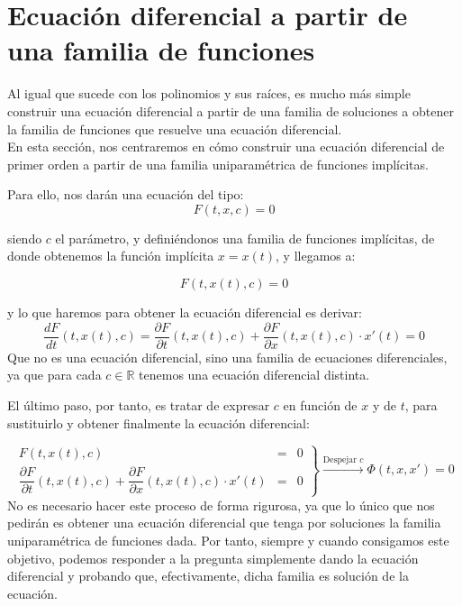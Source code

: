 \section{Ecuación diferencial a partir de una familia de funciones}\label{sec:1.4}
Al igual que sucede con los polinomios y sus raíces, es mucho más simple construir una ecuación diferencial a partir de una familia de soluciones a obtener la familia de funciones que resuelve una ecuación diferencial.\\

En esta sección, nos centraremos en cómo construir una ecuación diferencial de primer orden a partir de una familia uniparamétrica de funciones implícitas.

Para ello, nos darán una ecuación del tipo:
\begin{equation*}
    F(t,x,c) = 0
\end{equation*}

siendo $c$ el parámetro, y definiéndonos una familia de funciones implícitas, de donde obtenemos la función implícita $x=x(t)$, y llegamos a:

\begin{equation*}
    F(t,x(t),c) = 0
\end{equation*}

y lo que haremos para obtener la ecuación diferencial es derivar:
\begin{equation*}
    \dfrac{dF}{dt}(t,x(t),c) = \dfrac{\partial F}{\partial t}(t,x(t),c) + \dfrac{\partial F}{\partial x}(t,x(t),c)\cdot x'(t) = 0
\end{equation*}
Que no es una ecuación diferencial, sino una familia de ecuaciones diferenciales, ya que para cada $c\in \mathbb{R}$ tenemos una ecuación diferencial distinta.

El último paso, por tanto, es tratar de expresar $c$ en función de $x$ y de $t$, para sustituirlo y obtener finalmente la ecuación diferencial:

\begin{equation*}
    \left.\begin{array}{rcr}
            F(t,x(t),c) &=& 0 \\
            \dfrac{\partial F}{\partial t}(t,x(t),c) + \dfrac{\partial F}{\partial x}(t,x(t),c)\cdot x'(t) &=& 0
        \end{array}\right\} \overset{\text{Despejar $c$}}{\longrightarrow } \Phi(t,x,x') = 0
\end{equation*}
No es necesario hacer este proceso de forma rigurosa, ya que lo único que nos pedirán es obtener una ecuación diferencial que tenga por soluciones la familia uniparamétrica de funciones dada. Por tanto, siempre y cuando consigamos este objetivo, podemos responder a la pregunta simplemente dando la ecuación diferencial y probando que, efectivamente, dicha familia es solución de la ecuación.

